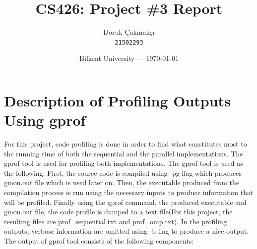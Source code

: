 \documentclass{article}
\title{CS426: Project \#3 Report} %
\author{Doruk Çakmakçı\\ \texttt{21502293}} %
\date{Bilkent University --- \today} %
\begin{document}
\maketitle %


\section{Description of Profiling Outputs Using gprof} 
\qquad For this project, code profiling is done in order to find what constitutes most to the running time of both the sequential and the parallel implementations. The gprof tool is used for profiling both implementations. The gprof tool is used as the following: First, the source code is compiled using -pg flag which produces gmon.out file which is used later on. Then, the executable produced from the compilation process is run using the necessary inputs to produce information that will be profiled. Finally using the gprof command, the produced executable and gmon.out file, the code profile is dumped to a text file(For this project, the resulting files are prof\_sequential.txt and prof\_omp.txt). In the profiling outputs, verbose information are omitted using -b flag to produce a nice output.\\
\null \qquad The output of gprof tool consists of the following components: 
\end{document}
